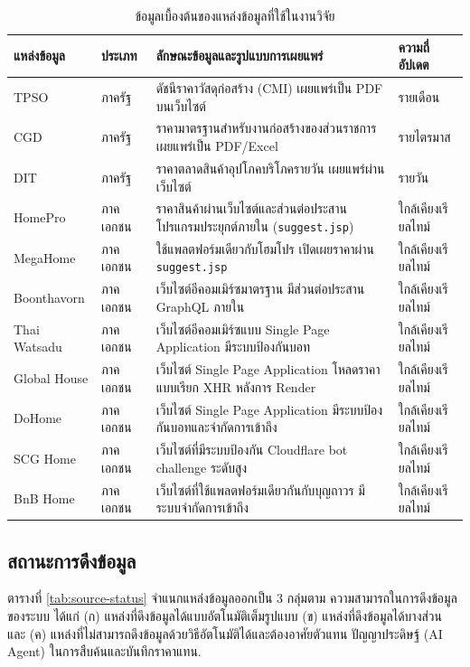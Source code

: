 \begin{table}[H]
\centering
\caption{ข้อมูลเบื้องต้นของแหล่งข้อมูลที่ใช้ในงานวิจัย}
\label{tab:source-overview}
\scriptsize
\begin{tabularx}{\textwidth}{l l X l}
\toprule
\textbf{แหล่งข้อมูล} & \textbf{ประเภท} & \textbf{ลักษณะข้อมูลและรูปแบบการเผยแพร่} & \textbf{ความถี่อัปเดต} \\
\midrule
TPSO & ภาครัฐ & ดัชนีราคาวัสดุก่อสร้าง (CMI) เผยแพร่เป็น PDF บนเว็บไซต์ & รายเดือน \\
CGD & ภาครัฐ & ราคามาตรฐานสำหรับงานก่อสร้างของส่วนราชการ เผยแพร่เป็น PDF/Excel & รายไตรมาส \\
DIT & ภาครัฐ & ราคาตลาดสินค้าอุปโภคบริโภครายวัน เผยแพร่ผ่านเว็บไซต์ & รายวัน \\
HomePro & ภาคเอกชน & ราคาสินค้าผ่านเว็บไซต์และส่วนต่อประสานโปรแกรมประยุกต์ภายใน (\texttt{suggest.jsp}) & ใกล้เคียงเรียลไทม์ \\
MegaHome & ภาคเอกชน & ใช้แพลตฟอร์มเดียวกับโฮมโปร เปิดเผยราคาผ่าน \texttt{suggest.jsp} & ใกล้เคียงเรียลไทม์ \\
Boonthavorn & ภาคเอกชน & เว็บไซต์อีคอมเมิร์ซมาตรฐาน มีส่วนต่อประสาน GraphQL ภายใน & ใกล้เคียงเรียลไทม์ \\
Thai Watsadu & ภาคเอกชน & เว็บไซต์อีคอมเมิร์ซแบบ Single Page Application มีระบบป้องกันบอท & ใกล้เคียงเรียลไทม์ \\
Global House & ภาคเอกชน & เว็บไซต์ Single Page Application โหลดราคาแบบเรียก XHR หลังการ Render & ใกล้เคียงเรียลไทม์ \\
DoHome & ภาคเอกชน & เว็บไซต์ Single Page Application มีระบบป้องกันบอทและจำกัดการเข้าถึง & ใกล้เคียงเรียลไทม์ \\
SCG Home & ภาคเอกชน & เว็บไซต์ที่มีระบบป้องกัน Cloudflare bot challenge ระดับสูง & ใกล้เคียงเรียลไทม์ \\
BnB Home & ภาคเอกชน & เว็บไซต์ที่ใช้แพลตฟอร์มเดียวกันกับบุญถาวร มีระบบจำกัดการเข้าถึง & ใกล้เคียงเรียลไทม์ \\
\bottomrule
\end{tabularx}
\end{table}

\subsection{สถานะการดึงข้อมูล}

ตารางที่ \ref{tab:source-status} จำแนกแหล่งข้อมูลออกเป็น 3 กลุ่มตาม
ความสามารถในการดึงข้อมูลของระบบ ได้แก่
(ก) แหล่งที่ดึงข้อมูลได้แบบอัตโนมัติเต็มรูปแบบ
(ข) แหล่งที่ดึงข้อมูลได้บางส่วน และ
(ค) แหล่งที่ไม่สามารถดึงข้อมูลด้วยวิธีอัตโนมัติได้และต้องอาศัยตัวแทน
ปัญญาประดิษฐ์ (AI Agent) ในการสืบค้นและบันทึกราคาแทน.

